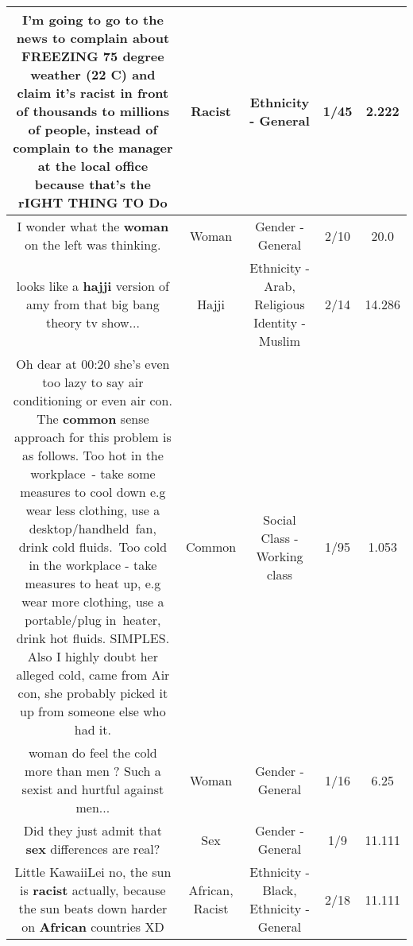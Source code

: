 \documentclass[11pt]{article}
\newlength\mylength
\begin{document}
\begin{center}
\begin{longtable}{|C{.65\mylength}|C{.30\mylength}|C{.12\mylength}|C{.12\mylength}|C{.12\mylength}|}
  \small I'm going to go to the news to complain about FREEZING 75 degree weather (22 C) and claim it's \textbf{racist} in front of thousands to millions of people, instead of complain to the manager at the local office because that's the rIGHT THING TO Do\normalsize   & Racist & Ethnicity - General & 1/45 & 2.222 \\  \hline
  \small I wonder what the \textbf{woman} on the left was thinking.\normalsize   & Woman & Gender - General & 2/10 & 20.0 \\  \hline
  \small looks like a \textbf{h\textbf{ajji}} version of amy from that big bang theory tv show...\normalsize   & Hajji & Ethnicity - Arab, Religious Identity - Muslim & 2/14 & 14.286 \\  \hline
  \small Oh dear at 00:20 she's even too lazy to say air conditioning or even air con. The \textbf{common} sense approach for this problem is as follows. Too hot in the workplace - take some measures to cool down e.g wear less clothing, use a desktop/handheld fan, drink cold fluids. Too cold in the workplace - take measures to heat up, e.g wear more clothing, use a portable/plug in heater, drink hot fluids. SIMPLES. Also I highly doubt her alleged cold, came from Air con, she probably picked it up from someone else who had it.\normalsize   & Common & Social Class - Working class & 1/95 & 1.053 \\  \hline
  \small woman do feel the cold more than men ?  Such a sexist and hurtful against men...\normalsize   & Woman & Gender - General & 1/16 & 6.25 \\  \hline
  \small Did they just admit that \textbf{sex} differences are real?\normalsize   & Sex & Gender - General & 1/9 & 11.111 \\  \hline
  \small Little KawaiiLei no, the sun is \textbf{racist} actually, because the sun beats down harder on \textbf{African} countries XD\normalsize   & African, Racist & Ethnicity - Black, Ethnicity - General & 2/18 & 11.111 \\  \hline

\end{longtable}
\end{center}
\end{document}
